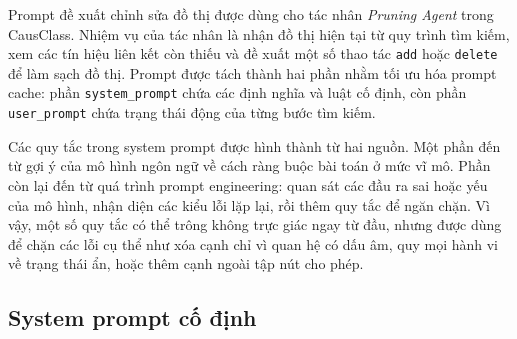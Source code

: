 Prompt đề xuất chỉnh sửa đồ thị được dùng cho tác nhân \textit{Pruning Agent} trong CausClass. Nhiệm vụ của tác nhân là nhận đồ thị hiện tại từ quy trình tìm kiếm, xem các tín hiệu liên kết còn thiếu và đề xuất một số thao tác \texttt{add} hoặc \texttt{delete} để làm sạch đồ thị. Prompt được tách thành hai phần nhằm tối ưu hóa prompt cache: phần \texttt{system\_prompt} chứa các định nghĩa và luật cố định, còn phần \texttt{user\_prompt} chứa trạng thái động của từng bước tìm kiếm.

Các quy tắc trong system prompt được hình thành từ hai nguồn. Một phần đến từ gợi ý của mô hình ngôn ngữ về cách ràng buộc bài toán ở mức vĩ mô. Phần còn lại đến từ quá trình prompt engineering: quan sát các đầu ra sai hoặc yếu của mô hình, nhận diện các kiểu lỗi lặp lại, rồi thêm quy tắc để ngăn chặn. Vì vậy, một số quy tắc có thể trông không trực giác ngay từ đầu, nhưng được dùng để chặn các lỗi cụ thể như xóa cạnh chỉ vì quan hệ có dấu âm, quy mọi hành vi về trạng thái ẩn, hoặc thêm cạnh ngoài tập nút cho phép.

\subsection{System prompt cố định}

